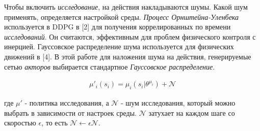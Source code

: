 Чтобы включить \textit{исследование}, на действия накладываются шумы. Какой шум применять, определяется настройкой среды. \textit{Процесс Орнштейна-Уленбека} используется в DDPG в [2] для получения коррелированных по времени \textit{исследований}. Он считаются, эффективным для проблем физического контроля с инерцией. Гауссовское распределение шума используется для физических движений в [4]. В этой работе для наложения шума на действия, генерируемые сетью \textit{акторов} выбирается стандартное \textit{Гауссовское распределение}.

\begin{equation}
    \begin{multlined}
        \mu'_i(s_i) = \mu_i(s_i|\theta^{\mu_i}) + \mathcal{N}
    \end{multlined}
\end{equation}

где $\mu'$ - политика исследования, а $\mathcal{N}$ - шум исследования, который можно выбрать в зависимости от настроек среды. $\mathcal{N}$ затухает на каждом шаге со скоростью $\epsilon$, то есть $\mathcal{N} \leftarrow \epsilon \mathcal{N}$.
